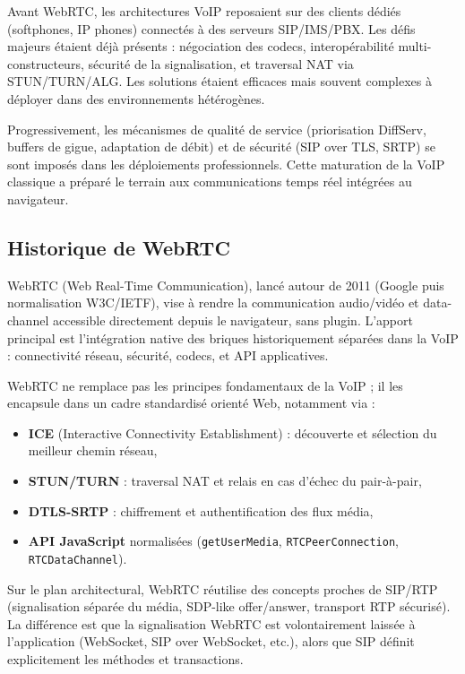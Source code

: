 \documentclass[12pt,a4paper]{article}
\begin{document}
Avant WebRTC, les architectures VoIP reposaient sur des clients dédiés (softphones, IP phones) connectés à des serveurs SIP/IMS/PBX. Les défis majeurs étaient déjà présents : négociation des codecs, interopérabilité multi-constructeurs, sécurité de la signalisation, et traversal NAT via STUN/TURN/ALG. Les solutions étaient efficaces mais souvent complexes à déployer dans des environnements hétérogènes.

Progressivement, les mécanismes de qualité de service (priorisation DiffServ, buffers de gigue, adaptation de débit) et de sécurité (SIP over TLS, SRTP) se sont imposés dans les déploiements professionnels. Cette maturation de la VoIP classique a préparé le terrain aux communications temps réel intégrées au navigateur.

\subsection{Historique de WebRTC}

WebRTC (Web Real-Time Communication), lancé autour de 2011 (Google puis normalisation W3C/IETF), vise à rendre la communication audio/vidéo et data-channel accessible directement depuis le navigateur, sans plugin. L'apport principal est l'intégration native des briques historiquement séparées dans la VoIP : connectivité réseau, sécurité, codecs, et API applicatives.

WebRTC ne remplace pas les principes fondamentaux de la VoIP ; il les encapsule dans un cadre standardisé orienté Web, notamment via :
\begin{itemize}[leftmargin=1.2cm]
    \item \textbf{ICE} (Interactive Connectivity Establishment) : découverte et sélection du meilleur chemin réseau,
    \item \textbf{STUN/TURN} : traversal NAT et relais en cas d'échec du pair-à-pair,
    \item \textbf{DTLS-SRTP} : chiffrement et authentification des flux média,
    \item \textbf{API JavaScript} normalisées (\texttt{getUserMedia}, \texttt{RTCPeerConnection}, \texttt{RTCDataChannel}).
\end{itemize}

Sur le plan architectural, WebRTC réutilise des concepts proches de SIP/RTP (signalisation séparée du média, SDP-like offer/answer, transport RTP sécurisé). La différence est que la signalisation WebRTC est volontairement laissée à l'application (WebSocket, SIP over WebSocket, etc.), alors que SIP définit explicitement les méthodes et transactions.
\end{document}
